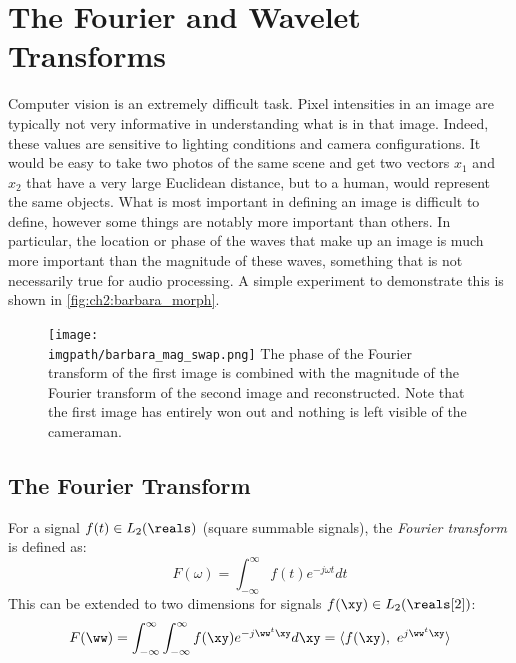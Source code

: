 \section{The Fourier and Wavelet Transforms}

  Computer vision is an extremely difficult task. Pixel intensities in an image are
  typically not very informative in understanding what is in that image. Indeed,
  these values are sensitive to lighting conditions and camera configurations.
  It would be easy to take two photos of the same scene and get two vectors
  $x_1$ and $x_2$ that have a very large Euclidean distance, but to a human,
  would represent the same objects. What is most important in defining an image is
  difficult to define, however some things are notably more important than
  others. In particular, the location or phase of the waves that make up an
  image is much more important than the magnitude of these waves, something
  that is not necessarily true for audio processing. A simple experiment to
  demonstrate this is shown in \autoref{fig:ch2:barbara_morph}. 
  \begin{figure}
    \centering
      \texttt{[image: \\imgpath/barbara\_mag\_swap.png]}
        {The phase of the Fourier transform of the first image is combined with
        the magnitude of the Fourier transform of the second image and
        reconstructed. Note that the first image has entirely won out and
        nothing is left visible of the cameraman.}
      \label{fig:ch2:barbara_morph}
  \end{figure}

\subsection{The Fourier Transform}
For a signal $f(t) \in L_2(\reals)$ (square summable signals), the \emph{Fourier
transform} is defined as:
\begin{equation}
  F(\omega) = \int_{-\infty}^{\infty} f(t) e^{-j\omega t} dt
\end{equation}
This can be extended to two dimensions for signals $f(\xy) \in L_2(\reals[2])$:
\begin{equation}
  F(\ww) = \int_{-\infty}^{\infty}\int_{-\infty}^{\infty} f(\xy) e^{-j\ww^t \xy} d\xy = \langle f(\xy),\ e^{j\ww^t \xy} \rangle
\end{equation}

